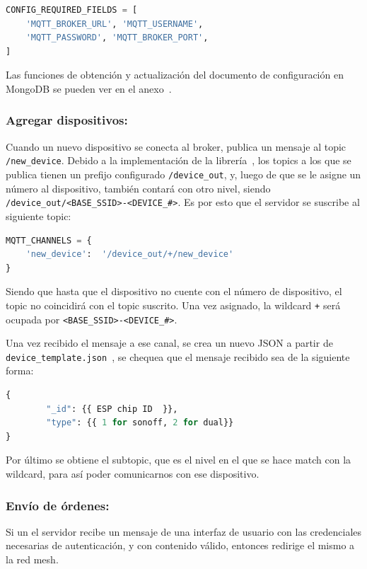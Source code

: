 \begin{lstlisting}[language=python]
CONFIG_REQUIRED_FIELDS = [
    'MQTT_BROKER_URL', 'MQTT_USERNAME',
    'MQTT_PASSWORD', 'MQTT_BROKER_PORT',
]
\end{lstlisting}

Las funciones de obtención y actualización del documento de configuración en MongoDB se pueden ver en el anexo~.

\subsubsection{Agregar dispositivos:}

Cuando un nuevo dispositivo se conecta al broker, publica un mensaje al topic \lstinline[columns=fixed]{/new_device}.
Debido a la implementación de la librería~, los topics a los que se publica tienen un prefijo configurado \lstinline[columns=fixed]{/device_out}, y, luego de que se le asigne un número al dispositivo, también contará con otro nivel, siendo \lstinline[columns=fixed]{/device_out/<BASE_SSID>-<DEVICE_#>}.
Es por esto que el servidor se suscribe al siguiente topic:

\begin{lstlisting}[language=python]
MQTT_CHANNELS = {
    'new_device':  '/device_out/+/new_device'
}
\end{lstlisting}
 
Siendo que hasta que el dispositivo no cuente con el número de dispositivo, el topic no coincidirá con el topic suscrito. Una vez asignado, la wildcard \lstinline[columns=fixed]{+} será ocupada por  \lstinline[columns=fixed]{<BASE_SSID>-<DEVICE_#>}.

Una vez recibido el mensaje a ese canal, se crea un nuevo JSON a partir de  \lstinline[columns=fixed]{device_template.json}~, se chequea que el mensaje recibido sea de la siguiente forma: 
 

\begin{lstlisting}[language=python]  
{
        "_id": {{ ESP chip ID  }},
        "type": {{ 1 for sonoff, 2 for dual}}
}
\end{lstlisting}
 
Por último se obtiene el subtopic, que es el nivel en el que se hace match con la wildcard, para así poder comunicarnos con ese dispositivo.

\subsubsection{Envío de órdenes:}
Si un el servidor recibe un mensaje de una interfaz de usuario con las credenciales necesarias de autenticación, y con contenido válido, entonces redirige el mismo a la red mesh.

